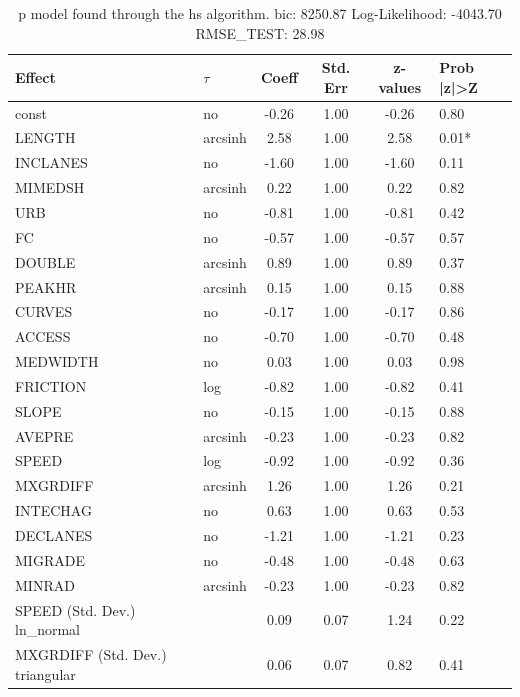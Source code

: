 \begin{table}
	\caption{p model found through the hs algorithm. bic: 8250.87 Log-Likelihood: -4043.70 RMSE_TEST: 28.98}
	\begin{center}
		\begin{tabular}{|l|l|c|c|c|l|}
			\hline
			Effect & $\tau$ & Coeff & Std. Err & z-values & Prob |z|>Z \\
			\hline
			const & no & -0.26 & 1.00 & -0.26 & 0.80 \\
			\hline
			LENGTH & arcsinh & 2.58 & 1.00 & 2.58 & 0.01* \\
			\hline
			INCLANES & no & -1.60 & 1.00 & -1.60 & 0.11 \\
			\hline
			MIMEDSH & arcsinh & 0.22 & 1.00 & 0.22 & 0.82 \\
			\hline
			URB & no & -0.81 & 1.00 & -0.81 & 0.42 \\
			\hline
			FC & no & -0.57 & 1.00 & -0.57 & 0.57 \\
			\hline
			DOUBLE & arcsinh & 0.89 & 1.00 & 0.89 & 0.37 \\
			\hline
			PEAKHR & arcsinh & 0.15 & 1.00 & 0.15 & 0.88 \\
			\hline
			CURVES & no & -0.17 & 1.00 & -0.17 & 0.86 \\
			\hline
			ACCESS & no & -0.70 & 1.00 & -0.70 & 0.48 \\
			\hline
			MEDWIDTH & no & 0.03 & 1.00 & 0.03 & 0.98 \\
			\hline
			FRICTION & log & -0.82 & 1.00 & -0.82 & 0.41 \\
			\hline
			SLOPE & no & -0.15 & 1.00 & -0.15 & 0.88 \\
			\hline
			AVEPRE & arcsinh & -0.23 & 1.00 & -0.23 & 0.82 \\
			\hline
			SPEED & log & -0.92 & 1.00 & -0.92 & 0.36 \\
			\hline
			MXGRDIFF & arcsinh & 1.26 & 1.00 & 1.26 & 0.21 \\
			\hline
			INTECHAG & no & 0.63 & 1.00 & 0.63 & 0.53 \\
			\hline
			DECLANES & no & -1.21 & 1.00 & -1.21 & 0.23 \\
			\hline
			MIGRADE & no & -0.48 & 1.00 & -0.48 & 0.63 \\
			\hline
			MINRAD & arcsinh & -0.23 & 1.00 & -0.23 & 0.82 \\
			\hline
			SPEED (Std. Dev.) ln_normal &  & 0.09 & 0.07 & 1.24 & 0.22 \\
			\hline
			MXGRDIFF (Std. Dev.) triangular &  & 0.06 & 0.07 & 0.82 & 0.41 \\

\end{tabular}
\end{center}
\end{table}
